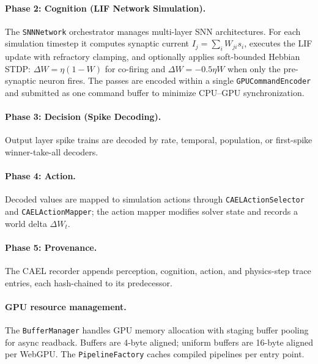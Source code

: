 \documentclass[10pt]{article}
\newcommand{\cael}{CAEL}
\begin{document}
\paragraph{Phase 2: Cognition (LIF Network Simulation).}
The \texttt{SNNNetwork} orchestrator manages multi-layer SNN architectures.
For each simulation timestep it computes synaptic current
$I_j=\sum_i W_{ji}s_i$, executes the LIF update with refractory clamping, and
optionally applies soft-bounded Hebbian STDP:
$\Delta W=\eta(1-W)$ for co-firing and $\Delta W=-0.5\eta W$ when only the
pre-synaptic neuron fires.
The passes are encoded within a single \texttt{GPUCommandEncoder} and submitted
as one command buffer to minimize CPU--GPU synchronization.

\paragraph{Phase 3: Decision (Spike Decoding).}
Output layer spike trains are decoded by rate, temporal, population, or
first-spike winner-take-all decoders.
\paragraph{Phase 4: Action.}
Decoded values are mapped to simulation actions through
\texttt{CAELActionSelector} and \texttt{CAELActionMapper}; the action mapper
modifies solver state and records a world delta $\Delta W_t$.
\paragraph{Phase 5: Provenance.}
The \cael{} recorder appends perception, cognition, action, and physics-step
trace entries, each hash-chained to its predecessor.

\paragraph{GPU resource management.}
The \texttt{BufferManager} handles GPU memory allocation with staging buffer
pooling for async readback. Buffers are 4-byte aligned; uniform buffers are
16-byte aligned per WebGPU. The \texttt{PipelineFactory} caches compiled
pipelines per entry point.
\end{document}
